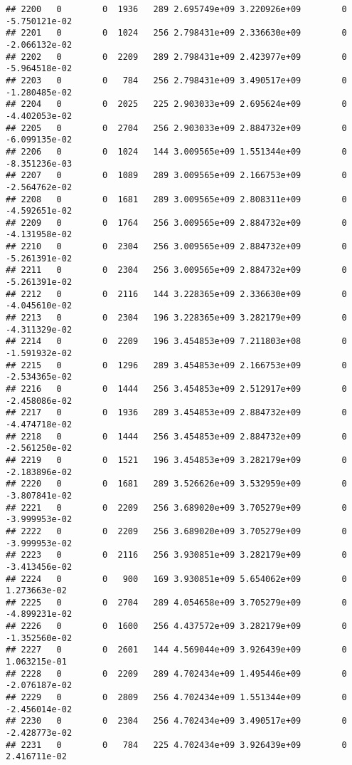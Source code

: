 \documentclass[
]{article}
\begin{document}
\begin{enumerate}
\begin{verbatim}
## 2200   0        0  1936   289 2.695749e+09 3.220926e+09        0 -5.750121e-02
## 2201   0        0  1024   256 2.798431e+09 2.336630e+09        0 -2.066132e-02
## 2202   0        0  2209   289 2.798431e+09 2.423977e+09        0 -5.964518e-02
## 2203   0        0   784   256 2.798431e+09 3.490517e+09        0 -1.280485e-02
## 2204   0        0  2025   225 2.903033e+09 2.695624e+09        0 -4.402053e-02
## 2205   0        0  2704   256 2.903033e+09 2.884732e+09        0 -6.099135e-02
## 2206   0        0  1024   144 3.009565e+09 1.551344e+09        0 -8.351236e-03
## 2207   0        0  1089   289 3.009565e+09 2.166753e+09        0 -2.564762e-02
## 2208   0        0  1681   289 3.009565e+09 2.808311e+09        0 -4.592651e-02
## 2209   0        0  1764   256 3.009565e+09 2.884732e+09        0 -4.131958e-02
## 2210   0        0  2304   256 3.009565e+09 2.884732e+09        0 -5.261391e-02
## 2211   0        0  2304   256 3.009565e+09 2.884732e+09        0 -5.261391e-02
## 2212   0        0  2116   144 3.228365e+09 2.336630e+09        0 -4.045610e-02
## 2213   0        0  2304   196 3.228365e+09 3.282179e+09        0 -4.311329e-02
## 2214   0        0  2209   196 3.454853e+09 7.211803e+08        0 -1.591932e-02
## 2215   0        0  1296   289 3.454853e+09 2.166753e+09        0 -2.534365e-02
## 2216   0        0  1444   256 3.454853e+09 2.512917e+09        0 -2.458086e-02
## 2217   0        0  1936   289 3.454853e+09 2.884732e+09        0 -4.474718e-02
## 2218   0        0  1444   256 3.454853e+09 2.884732e+09        0 -2.561250e-02
## 2219   0        0  1521   196 3.454853e+09 3.282179e+09        0 -2.183896e-02
## 2220   0        0  1681   289 3.526626e+09 3.532959e+09        0 -3.807841e-02
## 2221   0        0  2209   256 3.689020e+09 3.705279e+09        0 -3.999953e-02
## 2222   0        0  2209   256 3.689020e+09 3.705279e+09        0 -3.999953e-02
## 2223   0        0  2116   256 3.930851e+09 3.282179e+09        0 -3.413456e-02
## 2224   0        0   900   169 3.930851e+09 5.654062e+09        0  1.273663e-02
## 2225   0        0  2704   289 4.054658e+09 3.705279e+09        0 -4.899231e-02
## 2226   0        0  1600   256 4.437572e+09 3.282179e+09        0 -1.352560e-02
## 2227   0        0  2601   144 4.569044e+09 3.926439e+09        0  1.063215e-01
## 2228   0        0  2209   289 4.702434e+09 1.495446e+09        0 -2.076187e-02
## 2229   0        0  2809   256 4.702434e+09 1.551344e+09        0 -2.456014e-02
## 2230   0        0  2304   256 4.702434e+09 3.490517e+09        0 -2.428773e-02
## 2231   0        0   784   225 4.702434e+09 3.926439e+09        0  2.416711e-02

\end{verbatim}
\end{enumerate}
\end{document}
